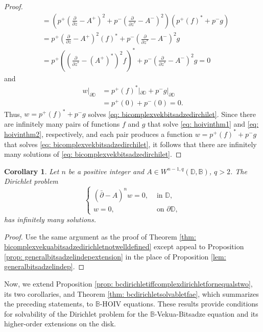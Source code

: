 \documentclass[12pt,reqno]{amsart}
\newtheorem{corr}[theorem]{Corollary}
\theoremstyle{definition}
\theoremstyle{remark}
\newcommand{\p}{\partial}
\newcommand{\dbar}{\bar\partial}
\newcommand{\bc}{\mathbb{B}}
\newcommand{\disk}{\mathbb{D}}
\begin{document}
\begin{proof}
\begin{align*}
                    &=  \left(p^+ \left(\frac{\p}{\p z}- A^+ \right)^2 + p^- \left(\frac{\p}{\p z^*}-  A^-\right)^2\right) (p^+ (f)^* + p^- g) \\
                    &= p^+ \left(\frac{\p}{\p z}- A^+ \right)^2 (f)^* + p^-  \left(\frac{\p}{\p z^*}-  A^-\right)^2 g \\
                    &= p^+\left(  \left(\frac{\p}{\p z^*}- (A^+)^* \right)^2 f \right)^*+ p^-  \left(\frac{\p}{\p z^*}-  A^-\right)^2 g =0
                 \end{align*}
                 and 
                 \begin{align*}
                    w|_{\p \disk} &= p^+ (f)^*|_{\p\disk} + p^- g|_{\p\disk} \\
                    &= p^+(0) + p^- (0) = 0.
                 \end{align*}
                 Thus, $w = p^+ (f)^* + p^- g$ solves \eqref{eq: bicomplexvekbitsadzedirchilet}. Since there are infinitely many pairs of functions $f$ and $g$ that solve \eqref{eq: hoivinthm1} and \eqref{eq: hoivinthm2}, respectively, and each pair produces a function $w = p^+ (f)^* + p^- g$ that solves \eqref{eq: bicomplexvekbitsadzedirchilet}, it follows that there are infinitely many solutions of \eqref{eq: bicomplexvekbitsadzedirchilet}. 
            
            \end{proof}

             \begin{corr}
            Let $n$ be a positive integer and $A \in W^{n-1,q}(\disk,\bc)$, $q>2$. The Dirichlet problem 
            \[
            \begin{cases}
                \left( \dbar - A \right)^n w = 0, & \text{ in } \disk,\\
                w = 0, & \text{ on } \p\disk,
            \end{cases}
            \]
            has infinitely many solutions. 
            \end{corr}

            \begin{proof}
                Use the same argument as the proof of Theorem \ref{thm: bicomplexvekuabitsadzedirichletnotwelldefined} except appeal to Proposition \ref{prop: generalbitsadzelindepextension} in the place of Proposition \ref{lem: generalbitsadzelindep}. 
            \end{proof}

            Now, we extend Proposition \ref{prop: bcdirichletiffcomplexdirichletfornequalstwo}, its two corollaries, and Theorem \ref{thm: bcdirichletsolvabletfae}, which summarizes the preceding statements, to $\bc$-HOIV equations. These results provide conditions for solvability of the Dirichlet problem for the $\bc$-Vekua-Bitsadze equation and its higher-order extensions on the disk. 
\end{document}
